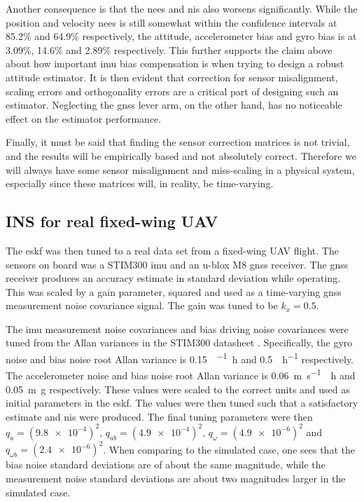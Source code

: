 Another consequence is that the \acrshort{nees} and \acrshort{nis} also worsens significantly. While the position and velocity \acrshort{nees} is still somewhat within the confidence intervals at 85.2\% and 64.9\% respectively, the attitude, accelerometer bias and gyro bias is at 3.09\%, 14.6\% and 2.89\% respectively. This further supports the claim above about how important \acrshort{imu} bias compensation is when trying to design a robust attitude estimator. It is then evident that correction for sensor misalignment, scaling errors and orthogonality errors are a critical part of designing such an estimator. Neglecting the \acrshort{gnss} lever arm, on the other hand, has no noticeable effect on the estimator performance.

Finally, it must be said that finding the sensor correction matrices is not trivial, and the results will be empirically based and not absolutely correct. Therefore we will always have some sensor misalignment and miss-scaling in a physical system, especially since these matrices will, in reality, be time-varying.

\subsection{INS for real fixed-wing UAV}


The \acrshort{eskf} was then tuned to a real data set from a fixed-wing UAV flight. The sensors on board was a STIM300 \acrshort{imu} and an u-blox M8 \acrshort{gnss} receiver. The \acrshort{gnss} receiver produces an accuracy estimate in standard deviation while operating. This was scaled by a gain parameter, squared and used as a time-varying \acrshort{gnss} measurement noise covariance signal. The gain was tuned to be $k_x = 0.5$.

The \acrshort{imu} measurement noise covariances and bias driving noise covariances were tuned from the Allan variances in the STIM300 datasheet \cite{stim300}. Specifically, the gyro noise and bias noise root Allan variance is \SI{0.15}{\deg\per\sqrt\hour} and \SI{0.5}{\deg\per\hour} respectively. The accelerometer noise and bias noise root Allan variance is \SI{0.06}{\meter\per\second\sqrt\hour} and \SI{0.05}{\meter g} respectively. These values were scaled to the correct units and used as initial parameters in the \acrshort{eskf}. The values were then tuned such that a satisfactory estimate and \acrshort{nis} were produced. The final tuning parameters were 
then $q_{a} = (\SI{9.8e-4})^2$, $ q_{ab} = (\SI{4.9e-4})^2$, $q_{\omega} = (\SI{4.9e-6})^2$ and $q_{\omega b} = (\SI{2.4e-6})^2$. When comparing to the simulated case, one sees that the bias noise standard deviations are of about the same magnitude, while the measurement noise standard deviations are about two magnitudes larger in the simulated case.

